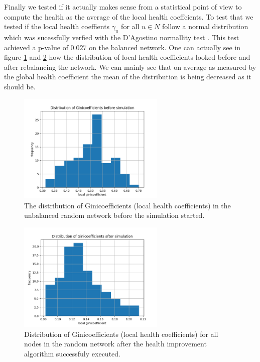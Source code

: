 \documentclass[a4paper]{paper}
\begin{document}
Finally we tested if it actually makes sense from a statistical point of view to compute the health as the average of the local health coeffcients.
To test that we tested if the local health coeffients $\gamma_u$ for all $u \in N$ follow a normal distribution which was sucessfully verfied with the D'Agostino normallity test \cite{d1971omnibus}.
This test achieved a p-value of $0.027$ on the balanced network.
One can actually see in figure \ref{fig:giniStart} and \ref{fig:giniEnd} how the distribution of local health coefficients looked before and after rebalancing the network. We can mainly see that on average as measured by the global health coefficient the mean of the distribution is being decreased as it should be.
\begin{figure}
 \centering
 \includegraphics[width=7cm]{code/results/routabilityTest/1574847007_ginicoefficients_start.png}
 \caption{The distribution of Ginicoefficients (local health coefficients) in the unbalanced random network before the simulation started.}
 \label{fig:giniStart}
\end{figure}
\begin{figure}
 \centering
 \includegraphics[width=7cm]{code/results/routabilityTest/1574847007_ginicoefficients_end.png}
 \caption{Distribution of Ginicoefficients (local health coefficients) for all nodes in the random network after the health improvement algorithm successfuly executed.}
 \label{fig:giniEnd}
\end{figure}
\end{document}
